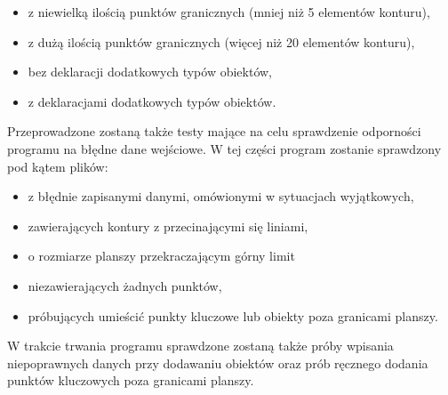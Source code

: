 \documentclass[a4paper,12pt]{article}
\begin{document}
\begin{itemize}
\item z niewielką ilością punktów granicznych (mniej niż 5 elementów konturu),
\item z dużą ilością punktów granicznych (więcej niż 20 elementów konturu),
\item bez deklaracji dodatkowych typów obiektów,
\item z deklaracjami dodatkowych typów obiektów.
\end{itemize}

Przeprowadzone zostaną także testy mające na celu sprawdzenie odporności programu na błędne dane wejściowe. W tej części program zostanie sprawdzony pod kątem plików:

\begin{itemize}
\item z błędnie zapisanymi danymi, omówionymi w sytuacjach wyjątkowych,
\item zawierających kontury z przecinającymi się liniami,
\item o rozmiarze planszy przekraczającym górny limit
\item niezawierających żadnych punktów,
\item próbujących umieścić punkty kluczowe lub obiekty poza granicami planszy.
\end{itemize}

W trakcie trwania programu sprawdzone zostaną także próby wpisania niepoprawnych danych przy dodawaniu obiektów oraz prób ręcznego dodania punktów kluczowych poza granicami planszy.
\end{document}
